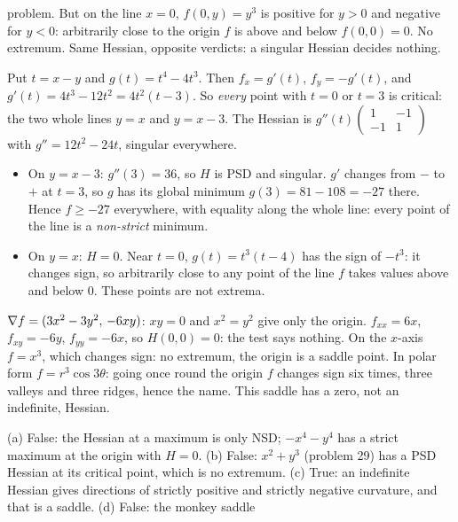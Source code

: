 \begin{solutions}
        problem. But on the line $x=0$, $f(0,y)=y^{3}$ is positive for
        $y>0$ and negative for $y<0$: arbitrarily close to the origin $f$
        is above and below $f(0,0)=0$. No extremum. Same Hessian, opposite
        verdicts: a singular Hessian decides nothing.
  \item Put $t=x-y$ and $g(t)=t^{4}-4t^{3}$. Then $f_{x}=g'(t)$,
        $f_{y}=-g'(t)$, and $g'(t)=4t^{3}-12t^{2}=4t^{2}(t-3)$. So
        \emph{every} point with $t=0$ or $t=3$ is critical: the two whole
        lines $y=x$ and $y=x-3$. The Hessian is
        $g''(t)\begin{pmatrix}1&-1\\-1&1\end{pmatrix}$ with
        $g''=12t^{2}-24t$, singular everywhere.
        \begin{itemize}[leftmargin=1.2em,itemsep=0.2ex]
          \item On $y=x-3$: $g''(3)=36$, so $H$ is PSD and singular.
                $g'$ changes from $-$ to $+$ at $t=3$, so $g$ has its global
                minimum $g(3)=81-108=-27$ there. Hence $f\ge-27$ everywhere,
                with equality along the whole line: every point of the line
                is a \emph{non-strict} minimum.
          \item On $y=x$: $H=0$. Near $t=0$, $g(t)=t^{3}(t-4)$ has the sign
                of $-t^{3}$: it changes sign, so arbitrarily close to any
                point of the line $f$ takes values above and below $0$.
                These points are not extrema.
        \end{itemize}
  \item $\nabla f=(3x^{2}-3y^{2},\,-6xy)$: $xy=0$ and $x^{2}=y^{2}$ give
        only the origin. $f_{xx}=6x$, $f_{xy}=-6y$, $f_{yy}=-6x$, so
        $H(0,0)=0$: the test says nothing. On the $x$-axis $f=x^{3}$, which
        changes sign: no extremum, the origin is a saddle point. In polar
        form $f=r^{3}\cos3\theta$: going once round the origin $f$ changes
        sign six times, three valleys and three ridges, hence the name.
        This saddle has a zero, not an indefinite, Hessian.
  \item (a) False: the Hessian at a maximum is only NSD;
        $-x^{4}-y^{4}$ has a strict maximum at the origin with $H=0$.
        (b) False: $x^{2}+y^{3}$ (problem 29) has a PSD Hessian at its
        critical point, which is no extremum. (c) True: an indefinite
        Hessian gives directions of strictly positive and strictly negative
        curvature, and that is a saddle. (d) False: the monkey saddle

\end{solutions}
